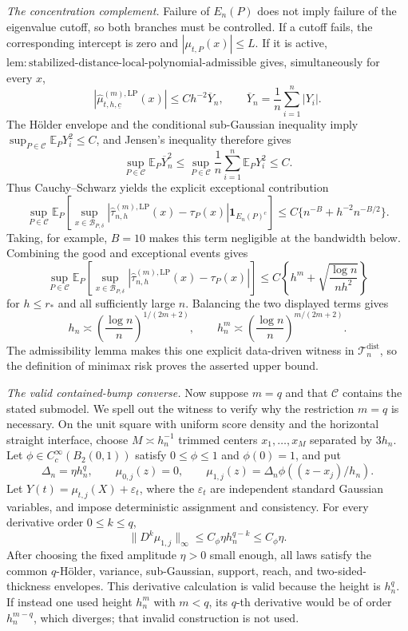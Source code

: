 \emph{The concentration complement.}
Failure of \(E_n(P)\) does not imply failure of the eigenvalue cutoff, so both branches must be controlled.  If a cutoff fails, the corresponding intercept is zero and \(|\mu_{t,P}(x)|\leq L\).  If it is active, \(\mathrm{lem:stabilized\text{-}distance\text{-}local\text{-}polynomial\text{-}admissible}\) gives, simultaneously for every \(x\),
\[
 \left|\widehat\mu^{(m),\mathrm{LP}}_{t,h,\underline c}(x)\right|
 \leq C h^{-2}\overline Y_n,
 \qquad \overline Y_n=\frac1n\sum_{i=1}^n|Y_i|.
\]
The H\"older envelope and the conditional sub-Gaussian inequality imply \(\sup_{P\in\mathcal C}\mathbb E_PY_i^2\leq C\), and Jensen's inequality therefore gives
\[
 \sup_{P\in\mathcal C}\mathbb E_P\overline Y_n^2
 \leq\sup_{P\in\mathcal C}\frac1n\sum_{i=1}^n\mathbb E_PY_i^2
 \leq C.
\]
Thus Cauchy--Schwarz yields the explicit exceptional contribution
\[
 \sup_{P\in\mathcal C}
 \mathbb E_P\!\left[
 \sup_{x\in\mathcal B_{P,\delta}}
 |\widehat\tau^{(m),\mathrm{LP}}_{n,h}(x)-\tau_P(x)|
 \mathbf 1_{E_n(P)^c}
 \right]
 \leq C\{n^{-B}+h^{-2}n^{-B/2}\}.
\]
Taking, for example, \(B=10\) makes this term negligible at the bandwidth below.  Combining the good and exceptional events gives
\[
 \sup_{P\in\mathcal C}\mathbb E_P\!\left[
 \sup_{x\in\mathcal B_{P,\delta}}
 |\widehat\tau^{(m),\mathrm{LP}}_{n,h}(x)-\tau_P(x)|
 \right]
 \leq C\left\{h^m+\sqrt{\frac{\log n}{nh^2}}\right\}
\]
for \(h\leq r_*\) and all sufficiently large \(n\).  Balancing the two displayed terms gives
\[
 h_n\asymp\left(\frac{\log n}{n}\right)^{1/(2m+2)},
 \qquad
 h_n^m\asymp\left(\frac{\log n}{n}\right)^{m/(2m+2)}.
\]
The admissibility lemma makes this one explicit data-driven witness in \(\mathcal T_n^{\mathrm{dist}}\), so the definition of minimax risk proves the asserted upper bound.

\emph{The valid contained-bump converse.}
Now suppose \(m=q\) and that \(\mathcal C\) contains the stated submodel.  We spell out the witness to verify why the restriction \(m=q\) is necessary.  On the unit square with uniform score density and the horizontal straight interface, choose \(M\asymp h_n^{-1}\) trimmed centers \(x_1,\ldots,x_M\) separated by \(3h_n\).  Let \(\phi\in C_c^\infty(B_2(0,1))\) satisfy \(0\leq\phi\leq1\) and \(\phi(0)=1\), and put
\[
 \Delta_n=\eta h_n^q,
 \qquad
 \mu_{0,j}(z)=0,
 \qquad
 \mu_{1,j}(z)=\Delta_n\phi((z-x_j)/h_n).
\]
Let \(Y(t)=\mu_{t,j}(X)+\varepsilon_t\), where the \(\varepsilon_t\) are independent standard Gaussian variables, and impose deterministic assignment and consistency.  For every derivative order \(0\leq k\leq q\),
\[
 \|D^k\mu_{1,j}\|_\infty
 \leq C_\phi\eta h_n^{q-k}\leq C_\phi\eta.
\]
After choosing the fixed amplitude \(\eta>0\) small enough, all laws satisfy the common \(q\)-H\"older, variance, sub-Gaussian, support, reach, and two-sided-thickness envelopes.  This derivative calculation is valid because the height is \(h_n^q\).  If instead one used height \(h_n^m\) with \(m<q\), its \(q\)-th derivative would be of order \(h_n^{m-q}\), which diverges; that invalid construction is not used.

